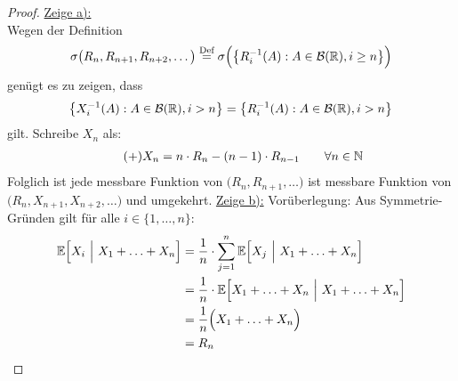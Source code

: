 \documentclass[12pt,a4paper]{article}
\begin{document}
\begin{proof}
	\underline{Zeige a):}\\
	Wegen der Definition
	\begin{align*}
		\sigma\big(R_n,R_{n+1},R_{n+2},\ldots\big)
		\stackrel{\text{Def}}{=}\sigma\Big(\big\lbrace R_i^{-1}(A):A\in\mathcal{B}(\mathbb{R}),i\geq n\big\rbrace\Big)
	\end{align*}
	genügt es zu zeigen, dass 
	\begin{align*}
		\left\lbrace X_i^{-1}(A):A\in\mathcal{B}(\mathbb{R}),i>n\right\rbrace=\left\lbrace R_i^{-1}(A):A\in\mathcal{B}(\mathbb{R}),i>n\right\rbrace
	\end{align*}
	gilt. Schreibe $X_n$ als:
	\begin{align}\label{eqAufgabe1Plus}\tag{+}
		X_n=n\cdot R_n-(n-1)\cdot R_{n-1}\qquad\forall n\in\mathbb{N}
	\end{align}
	Folglich ist jede messbare Funktion von $\big(R_n,R_{n+1},\ldots\big)$ ist messbare Funktion von $\big(R_n,X_{n+1},X_{n+2},\ldots\big)$ und umgekehrt.\nl
	\underline{Zeige b):}
	Vorüberlegung: Aus Symmetrie-Gründen gilt für alle $i\in\lbrace1,\ldots,n\rbrace$:
	\begin{align*}
		\mathbb{E}\Big[X_i~\Big|~X_1+\ldots+X_n\Big]
		&=\frac{1}{n}\cdot\sum\limits_{j=1}^n\mathbb{E}\Big[X_j~\Big|~X_1+\ldots+X_n\Big]\\
		&=\frac{1}{n}\cdot\mathbb{E}\Big[X_1+\ldots+X_n~\Big|~X_1+\ldots+X_n\Big]\\
		&=\frac{1}{n}\Big(X_1+\ldots+X_n\Big)\\
		&=R_n
	\end{align*}		
	

\end{proof}
\end{document}
